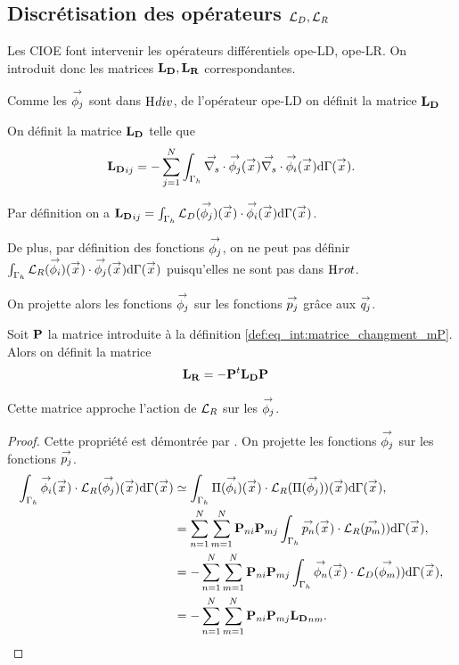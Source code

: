   \subsection[Discrétisation des opérateurs LD, LR]{Discrétisation des opérateurs \(\LD,\LR\)}
    Les CIOE font intervenir les opérateurs différentiels \gls{ope-LD}, \gls{ope-LR}. On introduit donc les matrices \(\mLD,\mLR\) correspondantes.

    Comme les \(\phij\) sont dans \(\Hdiv\), de l'opérateur \gls{ope-LD} on définit la matrice \(\mLD\)
    \begin{defn}
      On définit la matrice \(\mLD\) telle que
      \begin{align*}
          \mLD_{ij} = - \sum_{j=1}^N \int_{\Gamma_h} \vdivs \phij(\vx) \vdivs \phii(\vx) \dd{\Gamma}(\vx).
      \end{align*}
    \end{defn}

    Par définition on a \(\mLD_{ij} = \int_{\Gamma_h} \LD(\phij)(\vx)\cdot\phii(\vx)\dd{\Gamma}(\vx)\).

    De plus, par définition des fonctions \(\phij\), on ne peut pas définir \( \int_{\Gamma_h} \LR(\phii)(\vx) \cdot \phij(\vx) \dd{\Gamma}(\vx)\) puisqu'elles ne sont pas dans \(\Hrot\).

    On projette alors les fonctions \(\phij\) sur les fonctions \(\pj\) grâce aux \(\qj\).
    \begin{defn}
      Soit \(\mPP\) la matrice introduite à la définition \ref{def:eq_int:matrice_changment_mP}. Alors on définit la matrice
      \begin{align*}
        \mLR & = -\mPP^t\mLD\mPP
      \end{align*}
    \end{defn}
    \begin{prop}
      Cette matrice approche l'action de \(\LR\) sur les \(\phij\).
    \end{prop}
    \begin{proof}
      Cette propriété est démontrée par \cite[eq.~(17)]{stupfel_implementation_2015}. On projette les fonctions \(\phij\) sur les fonctions \(\pj\).
      \begin{align*}
        \int_{\Gamma_h} \phii(\vx) \cdot \LR(\phij)(\vx) \dd{\Gamma}(\vx) &\simeq \int_{\Gamma_h} \Pi(\phii)(\vx) \cdot \LR(\Pi(\phij)) (\vx) \dd{\Gamma}(\vx),
        \\
        &=\sum_{n=1}^{N} \sum_{m=1}^{N} \mPP_{ni} \mPP_{mj} \int_{\Gamma_h}\pn(\vx)\cdot\LR(\ppm)) \dd{\Gamma}(\vx),
        \\
        &=-\sum_{n=1}^{N} \sum_{m=1}^{N} \mPP_{ni} \mPP_{mj} \int_{\Gamma_h}\phin(\vx)\cdot\LD(\phim)) \dd{\Gamma}(\vx),
        \\
        &=-\sum_{n=1}^{N} \sum_{m=1}^{N} \mPP_{ni} \mPP_{mj} \mLD_{nm}.
      \end{align*}
    \end{proof}

